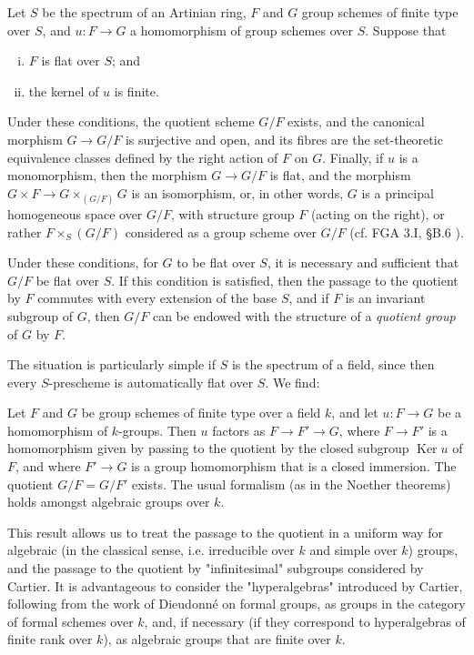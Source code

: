 \begin{theorem}\label{fga3.iii-7-theorem-7.2}
    Let $S$ be the spectrum of an Artinian ring, $F$ and $G$ group schemes of finite type over $S$, and $u\colon F\to G$ a homomorphism of group schemes over $S$.
    Suppose that

    \begin{enumerate}[i.]
        \item $F$ is flat over $S$; and
        \item the kernel of $u$ is finite.
    \end{enumerate}

    Under these conditions, the quotient scheme $G/F$ exists, and the canonical morphism $G\to G/F$ is surjective and open, and its fibres are the set-theoretic equivalence classes defined by the right action of $F$ on $G$.
    Finally, if $u$ is a monomorphism, then the morphism $G\to G/F$ is flat, and the morphism $G\times F\to G\times_{(G/F)}G$ is an isomorphism, or, in other words, $G$ is a principal homogeneous space over $G/F$, with structure group $F$ (acting on the right), or rather $F\times_S(G/F)$ considered as a group scheme over $G/F$ (cf. FGA 3.I, §B.6 ).
\end{theorem}

\begin{corollary}\label{fga3.iii-7-corollary-7.3}
    Under these conditions, for $G$ to be flat over $S$, it is necessary and sufficient that $G/F$ be flat over $S$.
    If this condition is satisfied, then the passage to the quotient by $F$ commutes with every extension of the base $S$, and if $F$ is an invariant subgroup of $G$, then $G/F$ can be endowed with the structure of a \emph{quotient group} of $G$ by $F$.
\end{corollary}


The situation is particularly simple if $S$ is the spectrum of a field, since then every $S$-prescheme is automatically flat over $S$.
We find:

\begin{corollary}\label{fga3.iii-7-corollary-7.4}
    Let $F$ and $G$ be group schemes of finite type over a field $k$, and let $u\colon F\to G$ be a homomorphism of $k$-groups.
    Then $u$ factors as $F\to F'\to G$, where $F\to F'$ is a homomorphism given by passing to the quotient by the closed subgroup $\operatorname{Ker} u$ of $F$, and where $F'\to G$ is a group homomorphism that is a closed immersion.
    The quotient $G/F=G/F'$ exists.
    The usual formalism (as in the Noether theorems) holds amongst algebraic groups over $k$.
\end{corollary}

This result allows us to treat the passage to the quotient in a uniform way for algebraic (in the classical sense, i.e. irreducible over $k$ and simple over $k$) groups, and the passage to the quotient by "infinitesimal" subgroups considered by Cartier.
It is advantageous to consider the "hyperalgebras" introduced by Cartier, following from the work of Dieudonné on formal groups, as groups in the category of formal schemes over $k$, and, if necessary (if they correspond to hyperalgebras of finite rank over $k$), as algebraic groups that are finite over $k$.
